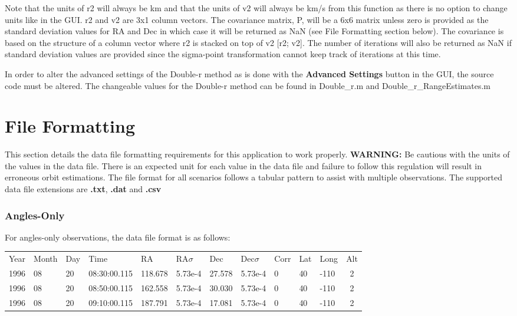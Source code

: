 \documentclass{article}
\begin{document}
			\par Note that the units of r2 will always be km and that the units of v2 will always be km/s from this function as there is no option to change units like in the GUI. r2 and v2 are 3x1 column
			vectors. The covariance matrix, P, will be a 6x6 matrix unless zero is provided as the standard deviation values for RA and Dec in which case it will be returned as NaN (see File Formatting section below). The covariance is 
			based on the structure of a column vector where r2 is stacked on top of v2 [r2; v2]. The number of iterations will also be returned as NaN if standard deviation values are provided since the sigma-point transformation cannot keep track of iterations at this time.\par

			In order to alter the advanced settings of the Double-r method as is done with the \textbf{Advanced Settings} button in the GUI, the source code must be altered. The changeable values for the Double-r method can be found in Double\_r.m and Double\_r\_RangeEstimates.m
    
	\section{File Formatting}
		\hspace{0.45 cm} This section details the data file formatting requirements for this application to work properly. \textbf{WARNING:} Be cautious with the units of the values in the data file. There is an 
                expected unit for each value in the data file and failure to follow this regulation will result in erroneous orbit estimations. The file format for all scenarios follows a tabular pattern to assist with multiple 
                observations. \newline\newline
		The supported data file extensions are \textbf{.txt}, \textbf{.dat} and \textbf{.csv}
			\subsubsection{Angles-Only}
				For angles-only observations, the data file format is as follows:
			       
			       \begin{center}
				{\footnotesize
			       \begin{tabular} {p{0.5 cm} p{0.75 cm} p{0.50 cm} p{1.5 cm} p{0.90 cm} p{1.10cm} p{0.80 cm} p{1.10 cm} p{0.55 cm} p{0.45 cm} p{0.55 cm} c}
				
				Year  & Month & Day & Time & RA & RA$\sigma$ & Dec & Dec$\sigma$ & Corr & Lat & Long & Alt\\
				1996 & 08 & 20 & 08:30:00.115 & 118.678 & 5.73e-4 & 27.578 & 5.73e-4 & 0 & 40 & -110 & 2\\
				1996 & 08 & 20 & 08:50:00.115 & 162.558 & 5.73e-4 & 30.030 & 5.73e-4 & 0 & 40 & -110 & 2\\
				1996 & 08 & 20 & 09:10:00.115 & 187.791 & 5.73e-4 & 17.081 & 5.73e-4 & 0 & 40 & -110 & 2\\
				\end{tabular}
				}
				\end{center}
				
\end{document}
